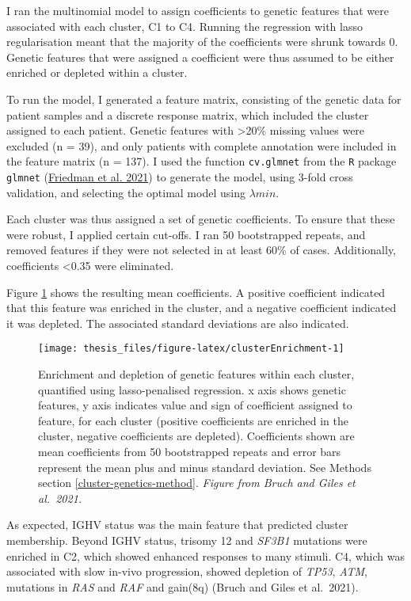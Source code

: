 \documentclass[11pt, a4paper, twosided]{book}
\begin{document}
I ran the multinomial model to assign coefficients to genetic features that were associated with each cluster, C1 to C4. Running the regression with lasso regularisation meant that the majority of the coefficients were shrunk towards 0. Genetic features that were assigned a coefficient were thus assumed to be either enriched or depleted within a cluster.

To run the model, I generated a feature matrix, consisting of the genetic data for patient samples and a discrete response matrix, which included the cluster assigned to each patient. Genetic features with \textgreater20\% missing values were excluded (n = 39), and only patients with complete annotation were included in the feature matrix (n = 137). I used the function \texttt{cv.glmnet} from the \texttt{R} package \texttt{glmnet} (\protect\hyperlink{ref-R-glmnet}{Friedman et al. 2021}) to generate the model, using 3-fold cross validation, and selecting the optimal model using \(\lambda{min}\).

Each cluster was thus assigned a set of genetic coefficients. To ensure that these were robust, I applied certain cut-offs. I ran 50 bootstrapped repeats, and removed features if they were not selected in at least 60\% of cases. Additionally, coefficients \textless0.35 were eliminated.

Figure \ref{fig:clusterEnrichment} shows the resulting mean coefficients. A positive coefficient indicated that this feature was enriched in the cluster, and a negative coefficient indicated it was depleted. The associated standard deviations are also indicated.


\begin{figure}

{\centering \texttt{[image: thesis\_files/figure-latex/clusterEnrichment-1]} 

}

\caption{Enrichment and depletion of genetic features within each cluster, quantified using lasso-penalised regression. x axis shows genetic features, y axis indicates value and sign of coefficient assigned to feature, for each cluster (positive coefficients are enriched in the cluster, negative coefficients are depleted). Coefficients shown are mean coefficients from 50 bootstrapped repeats and error bars represent the mean plus and minus standard deviation. See Methods section \ref{cluster-genetics-method}. \emph{Figure from Bruch and Giles et al.~2021. }}\label{fig:clusterEnrichment}
\end{figure}
As expected, IGHV status was the main feature that predicted cluster membership. Beyond IGHV status, trisomy 12 and \emph{SF3B1} mutations were enriched in C2, which showed enhanced responses to many stimuli. C4, which was associated with slow in-vivo progression, showed depletion of \emph{TP53}, \emph{ATM}, mutations in \emph{RAS} and \emph{RAF} and gain(8q) (Bruch and Giles et al.~2021).
\end{document}
